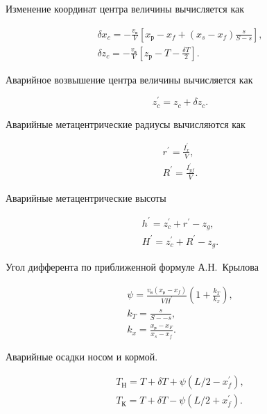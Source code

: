 Изменение координат центра величины вычисляется как

\begin{equation}
    \begin{split}
        \delta x_c = - \frac{v_{\text{в}}}{V} [x_{\text{р}} - x_f + (x_s - x_f)\frac{s}{S - s}], \\
        \delta z_c = - \frac{v_{\text{в}}}{V} [z_{\text{р}} - T - \frac{\delta T}{2}].
    \end{split}
\end{equation}

Аварийное возвышение центра величины вычисляется как

\begin{equation}
    z_c^\prime = z_c + \delta z_c.
\end{equation}

Аварийные метацентрические радиусы вычисляются как

\begin{equation}
    \begin{split}
        r^\prime = \frac{I_x^\prime}{V}, \\
        R^\prime = \frac{I_{yf}^\prime}{V}.
    \end{split}
\end{equation}

Аварийные метацентрические высоты

\begin{equation}
    \begin{split}
        h^\prime = z_c^\prime + r^\prime - z_g, \\
        H^\prime = z_c^\prime + R^\prime - z_g.
    \end{split}
\end{equation}

Угол дифферента по приближенной формуле А.Н.~Крылова

\begin{equation}
    \begin{split}
        \psi = \frac{v_{\text{в}} (x_{\text{р}} - x_f)}{V H^\prime} (1 + \frac{k_T}{k_x}), \\
        k_T = \frac{s}{S- - s}, \\
        k_x = \frac{x_{\text{р}} - x_F}{x_s - x_f}.
    \end{split}
\end{equation}

Аварийные осадки носом и кормой.

\begin{equation}
    \begin{split}
        T_{\text{Н}} = T + \delta T + \psi (L/2 - x_f^\prime), \\
        T_{\text{К}} = T + \delta T - \psi (L/2 + x_f^\prime).
    \end{split}
\end{equation}

